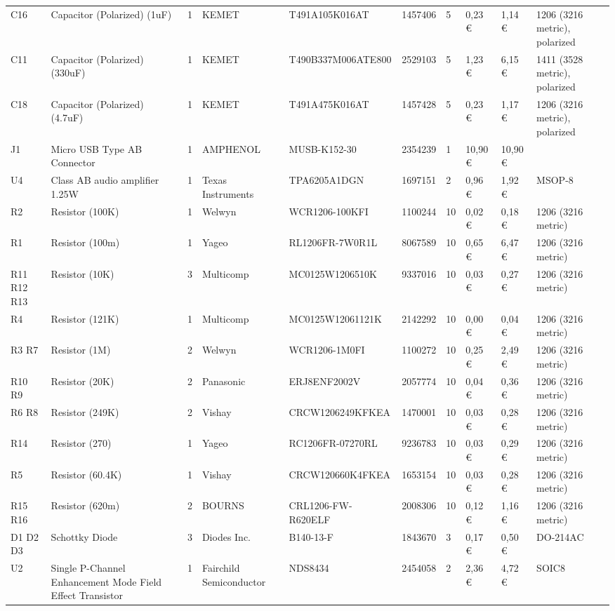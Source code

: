 \begin{appendices}
\begin{sidewaystable}
{\begin{tabular}{@{}llllllllll@{}}
C16 & Capacitor (Polarized) (1uF) & 1 & KEMET & T491A105K016AT & 1457406 & 5 & 0,23 € & 1,14 € & 1206 (3216 metric), polarized \\
C11 & Capacitor (Polarized) (330uF) & 1 & KEMET & T490B337M006ATE800 & 2529103 & 5 & 1,23 € & 6,15 € & 1411 (3528 metric), polarized \\
C18 & Capacitor (Polarized) (4.7uF) & 1 & KEMET & T491A475K016AT & 1457428 & 5 & 0,23 € & 1,17 € & 1206 (3216 metric), polarized \\
J1 & Micro USB Type AB Connector & 1 & AMPHENOL & MUSB-K152-30 & 2354239 & 1 & 10,90 € & 10,90 € &  \\
U4 & Class AB audio amplifier 1.25W & 1 & Texas Instruments & TPA6205A1DGN & 1697151 & 2 & 0,96 € & 1,92 € & MSOP-8 \\
R2 & Resistor (100K) & 1 & Welwyn & WCR1206-100KFI & 1100244 & 10 & 0,02 € & 0,18 € & 1206 (3216 metric) \\
R1 & Resistor (100m) & 1 & Yageo & RL1206FR-7W0R1L & 8067589 & 10 & 0,65 € & 6,47 € & 1206 (3216 metric) \\
R11 R12 R13 & Resistor (10K) & 3 & Multicomp & MC0125W1206510K & 9337016 & 10 & 0,03 € & 0,27 € & 1206 (3216 metric) \\
R4 & Resistor (121K) & 1 & Multicomp & MC0125W12061121K & 2142292 & 10 & 0,00 € & 0,04 € & 1206 (3216 metric) \\
R3 R7 & Resistor (1M) & 2 & Welwyn & WCR1206-1M0FI & 1100272 & 10 & 0,25 € & 2,49 € & 1206 (3216 metric) \\
R10 R9 & Resistor (20K) & 2 & Panasonic & ERJ8ENF2002V & 2057774 & 10 & 0,04 € & 0,36 € & 1206 (3216 metric) \\
R6 R8 & Resistor (249K) & 2 & Vishay & CRCW1206249KFKEA & 1470001 & 10 & 0,03 € & 0,28 € & 1206 (3216 metric) \\
R14 & Resistor (270) & 1 & Yageo & RC1206FR-07270RL & 9236783 & 10 & 0,03 € & 0,29 € & 1206 (3216 metric) \\
R5 & Resistor (60.4K) & 1 & Vishay & CRCW120660K4FKEA & 1653154 & 10 & 0,03 € & 0,28 € & 1206 (3216 metric) \\
R15 R16 & Resistor (620m) & 2 & BOURNS & CRL1206-FW-R620ELF & 2008306 & 10 & 0,12 € & 1,16 € & 1206 (3216 metric) \\
D1 D2 D3 & Schottky Diode & 3 & Diodes Inc. & B140-13-F & 1843670 & 3 & 0,17 € & 0,50 € & DO-214AC \\
U2 & Single P-Channel Enhancement Mode Field Effect Transistor & 1 & Fairchild Semiconductor & NDS8434 & 2454058 & 2 & 2,36 € & 4,72 € & SOIC8 \\

\end{tabular}}
\end{sidewaystable}
\end{appendices}
